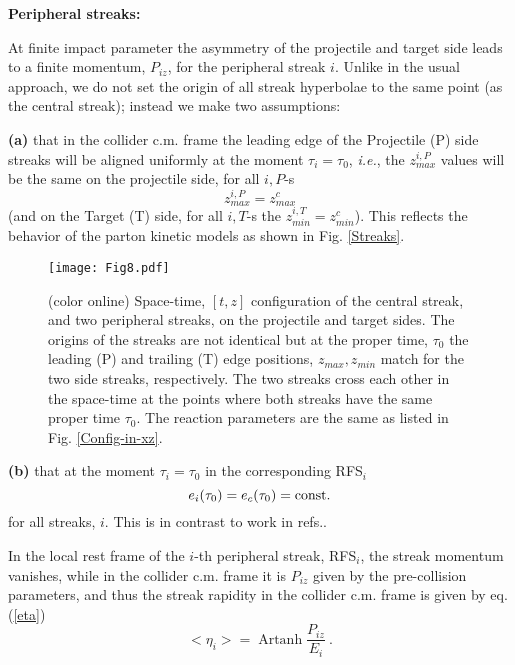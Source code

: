 \documentclass[aps,prc,twocolumn,floatfix,showpacs,a4paper,
nofootinbib,amsmath,amssymb]{revtex4-1}
\newcommand{\be}{\begin{equation}}
\newcommand{\ee}{\end{equation}}
\DeclareMathOperator{\Artanh}{Artanh}
\begin{document}
{\bf Peripheral streaks:}  %


At finite impact parameter the asymmetry of the projectile and target
side leads to a finite momentum, $P_{iz}$, for the peripheral streak $i$. 
Unlike in the usual approach, we do not set the origin of all streak hyperbolae
to the same point (as the central streak); instead we make two  assumptions:


{\bf(a)} that in the collider c.m. frame the
leading edge of the Projectile (P) side streaks will be aligned uniformly at the moment $\tau_i=\tau_0$, 
{\it i.e.}, the $z_{max}^{i,P}$
values will be the same on the  projectile side, for all $i,P$-s 
\be
z_{max}^{i,P}=z_{max}^{c}
\ee
(and on the Target (T) side, for all $i,T$-s the $z_{min}^{i,T}=z_{min}^c$).
This reflects the 
behavior of the parton kinetic models as shown in Fig. \ref{Streaks}.




%
\begin{figure}[htb]     %
\begin{center}
\resizebox{1.01\columnwidth}{!}
{\texttt{[image: Fig8.pdf]}}
\caption{ (color online)
Space-time, $[t,z]$ configuration of the central streak, 
and two peripheral streaks,
on the projectile and target sides. 
The origins of the streaks are not identical but at the
proper time, $\tau_0$  the leading (P) and trailing (T) edge positions, 
$z_{max}, z_{min}$ match for the two side streaks, respectively.
The two streaks cross each other in the space-time at the points where
both streaks have the same proper time $\tau_0$.
The reaction parameters are the same as 
listed in Fig. \ref{Config-in-xz}.
}
\label{st-2}
\end{center}
\end{figure}        %
%




%

%
{\bf (b)}
that at the moment $\tau_i=\tau_0$ in the corresponding RFS$_i$
\be
e_i(\tau_0) = e_c(\tau_0) = {\rm const.}
\label{Asp-b}
\ee
for all streaks, $i$.  This is in contrast to work in refs.\cite{M2001,M2002}. 
\vspace{.2cm}


In the local rest frame of the $i$-th peripheral streak, RFS$_i$, the 
streak momentum vanishes, while in the collider c.m. frame it is
$P_{iz}$ given by the pre-collision parameters,
and thus the streak rapidity in the collider c.m. frame is given by eq. (\ref{eta})
\be
<\eta_i> = 
\Artanh \frac{P_{iz}}{E_i}\ .
\ee
\end{document}
